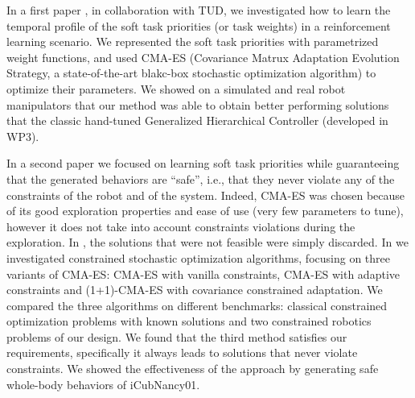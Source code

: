 In a first paper \cite{Modugno_PICRA_2016}, in collaboration with TUD, we investigated how to learn the temporal profile of the soft task priorities (or task weights) in a reinforcement learning scenario. We represented the soft task priorities with parametrized weight functions, and used CMA-ES (Covariance Matrux Adaptation Evolution Strategy, a state-of-the-art blakc-box stochastic optimization algorithm) to optimize their parameters. We showed on a simulated and real robot manipulators that our method was able to obtain better performing solutions that the classic hand-tuned Generalized Hierarchical Controller (developed in WP3).

In a second paper \cite{modugno2016learning} we focused on learning soft task priorities while guaranteeing that the generated behaviors are ``safe'', i.e., that they never violate any of the constraints of the robot and of the system. Indeed, CMA-ES was chosen because of its good exploration properties and ease of use (very few parameters to tune), however it does not take into account constraints violations during the exploration. In \cite{Modugno_PICRA_2016}, the solutions that were not feasible were simply discarded. In \cite{modugno2016learning} we investigated constrained stochastic optimization algorithms, focusing on three variants of CMA-ES: CMA-ES with vanilla constraints, CMA-ES with adaptive constraints and (1+1)-CMA-ES with covariance constrained adaptation. We compared the three algorithms on different benchmarks: classical constrained optimization problems with known solutions and two constrained robotics problems of our design. We found that the third method satisfies our requirements, specifically it always leads to solutions that never violate constraints. We showed the effectiveness of the approach by generating safe whole-body behaviors of iCubNancy01.